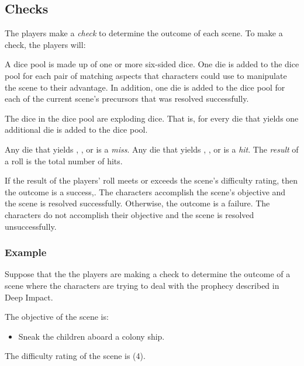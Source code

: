 \documentclass[12pt, a5paper, parskip=half-]{scrartcl}
\begin{document}
\subsection*{Checks}
The players make a \emph{check} to determine the outcome of each scene.
To make a check, the players will:
\begin{description}[labelindent=0.25cm, leftmargin=\widthof{\hspace{0.25cm}\textbullet\space}, font=\normalfont\textbullet\bfseries\space]%
\item[Assemble a Dice Pool]
     A dice pool is made up of one or more six-sided dice.
     One die is added to the dice pool for each pair of matching aspects that characters could use to manipulate the scene to their advantage.
     In addition, one die is added to the dice pool for each of the current scene's precursors that was resolved successfully.
 \item[Roll the Dice]
     The dice in the dice pool are exploding dice.
     That is, for every die that yields  one additional die is added to the dice pool.
\item[Compute the Result]
     Any die that yields , , or  is a \emph{miss}.
     Any die that yields , , or  is a \emph{hit}.
     The \emph{result} of a roll is the total number of hits.
\item[Determine the Outcome]
     If the result of the players' roll meets or exceeds the scene's difficulty rating, then the outcome is a success,.
     The characters accomplish the scene's objective and the scene is resolved successfully.
     Otherwise, the outcome is a failure.
     The characters do not accomplish their objective and the scene is resolved unsuccessfully.
 \end{description}

\newpage

\subsubsection*{Example}
Suppose that the  the players are making a check to determine the outcome of a scene where the characters are trying to deal with the prophecy described in {\cinzel \small Deep Impact}.

The objective of the scene is:
\begin{itemize}[leftmargin=\widthof{\hspace{0.25cm}\textbullet\space}, noitemsep,topsep=-1ex]
\item Sneak the children aboard a colony ship.
\end{itemize}
\vspace{1ex}
The difficulty rating of the scene is (4). 
\end{document}
